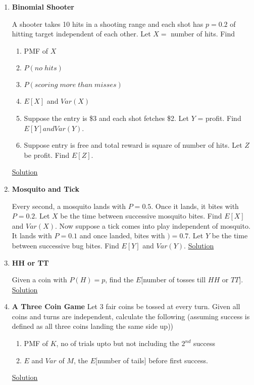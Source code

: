 \documentclass[11pt, a4paper]{article}
\begin{document}
\begin{enumerate}
    \item \hypertarget{q_binshoot}{\textbf{Binomial Shooter}}\newline
    A shooter takes 10 hits in a shooting range and each shot has $p=0.2$ of hitting target independent of each other. Let $X = $ number of hits. Find
    \begin{enumerate}
         \item PMF of $X$
         \item $P(no\;hits)$
         \item $P(scoring\;more\;than\;misses)$
         \item $E[X]$ and $Var(X)$
         \item Suppose the entry is \$3 and each shot fetches \$2. Let $Y$ = profit. Find $E[Y] and Var(Y)$.
         \item Suppose entry is free and total reward is square of number of hits. Let $Z$ be profit. Find $E[Z]$.
    \end{enumerate} \hyperlink{a_binshoot}{Solution}

    \item \hypertarget{q_mosquito}{\textbf{Mosquito and Tick}}\newline
    Every second, a mosquito lands with $P = 0.5$. Once it lands, it bites with $P=0.2$. Let $X$ be the time between successive mosquito bites. Find $E[X]$ and $Var(X)$.\newline
    Now suppose a tick comes into play independent of mosquito. It lands with $P=0.1$ and once landed, bites with $)=0.7$. Let $Y$ be the time between successive bug bites. Find $E[Y]$ and $Var(Y)$. \hyperlink{a_mosquito}{Solution}

    \item \hypertarget{q_hhtt}{\textbf{HH or TT}}\newline
    Given a coin with $P(H) = p$, find the $E$[number of tosses till $HH$ or $TT$]. \hyperlink{a_hhtt}{Solution}

    \item \label{itm:threecoins} \hypertarget{q_threecoins}{\textbf{A Three Coin Game}}\newline
    Let $3$ fair coins be tossed at every turn. Given all coins and turns are independent, calculate the following (assuming success is defined as all three coins landing the same side up))
    \begin{enumerate}
        \item PMF of $K$, no of trials upto but not including the $2^{nd}$ success
        \item $E$ and $Var$ of $M$, the $E[$number of tails$]$ before first success.
    \end{enumerate}
    \hyperlink{a_threecoins}{Solution}



\end{enumerate}
\end{document}
